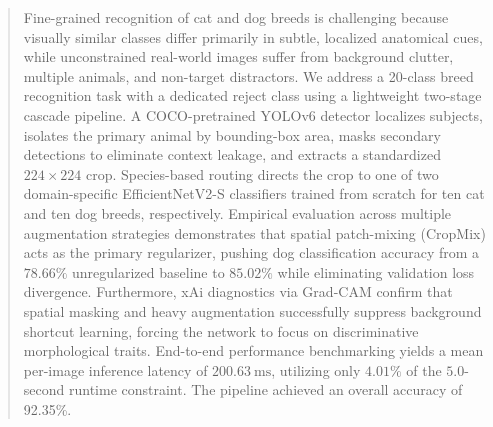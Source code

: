 \begin{abstract}
Fine-grained recognition of cat and dog breeds is challenging because visually similar classes differ primarily in subtle, localized anatomical cues, while unconstrained real-world images suffer from background clutter, multiple animals, and non-target distractors. We address a 20-class breed recognition task with a dedicated reject class using a lightweight two-stage cascade pipeline. A COCO-pretrained YOLOv6 detector localizes subjects, isolates the primary animal by bounding-box area, masks secondary detections to eliminate context leakage, and extracts a standardized $224\times224$ crop. Species-based routing directs the crop to one of two domain-specific EfficientNetV2-S classifiers trained from scratch for ten cat and ten dog breeds, respectively. Empirical evaluation across multiple augmentation strategies demonstrates that spatial patch-mixing (CropMix) acts as the primary regularizer, pushing dog classification accuracy from a $78.66\%$ unregularized baseline to $85.02\%$ while eliminating validation loss divergence. Furthermore, xAi diagnostics via Grad-CAM confirm that spatial masking and heavy augmentation successfully suppress background shortcut learning, forcing the network to focus on discriminative morphological traits. End-to-end performance benchmarking yields a mean per-image inference latency of $200.63~\text{ms}$, utilizing only $4.01\%$ of the $5.0$-second runtime constraint. The pipeline achieved an overall accuracy of 92.35\%.
\end{abstract}